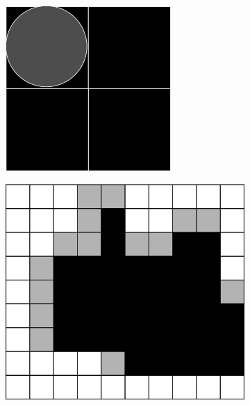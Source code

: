 \documentclass[
  digital,     %
  oneside,     %
  nosansbold,  %
  nocolorbold, %
  lof,         %
  lot,         %
]{fithesis4}
\begin{document}
\begin{figure}
\begin{subfigure}[t]{0.4\textwidth}
        \caption{}
        \label{fig:closing_dilation}
    \end{subfigure}
    \begin{subfigure}[t]{0.2\textwidth}
        \centering
        \includegraphics[width=\textwidth]{resources/inkscape/opening_erosion_se.png}
        \caption{}
        \label{fig:closing_erosion_se}
    \end{subfigure}
    \begin{subfigure}[t]{0.4\textwidth}
        \centering
        \includegraphics[width=\textwidth]{resources/inkscape/closing_erosion.png}

\end{subfigure}
\end{figure}
\end{document}
